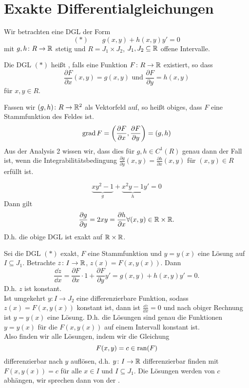\chapter{Exakte Differentialgleichungen}
Wir betrachten eine DGL der Form
\[ (\ast)\qquad g(x,y)+h(x,y)y'=0 \]
mit $ g,h\colon R\rightarrow\mathbb{R} $ stetig und $ R=J_1\times J_2 $, $ J_1,J_2\subseteq\mathbb{R} $ offene Intervalle.
\begin{definition}
	Die DGL $ (\ast) $ hei\ss t , falls eine Funktion $ F\colon R\rightarrow\mathbb{R} $ existiert, so dass
	\[ \frac{\partial F}{\partial x}(x,y)=g(x,y)\text{ und }\frac{\partial F}{\partial y}=h(x,y) \]
	f\"ur $ x,y\in R $.
\end{definition}
\begin{bemerkung}
	Fassen wir $ (g,h)\colon R\rightarrow\mathbb{R}^2 $ als Vektorfeld auf, so hei\ss t obiges, dass $ F $ eine Stammfunktion des Feldes ist.
	\[ \operatorname{grad} F=\left(\frac{\partial F}{\partial x},\frac{\partial F}{\partial y}\right)=(g,h) \]
	Aus der Analysis 2 wissen wir, dass dies f\"ur $ g,h\in C^1(R) $ genau dann der Fall ist, wenn die Integrabilit\"atsbedingung $ \frac{\partial g}{\partial y}(x,y)=\frac{\partial h}{\partial x}(x,y) $ f\"ur $ (x,y)\in R $ erf\"ullt ist. 
\end{bemerkung}
\begin{beispiel}
	\[ \underbrace{xy^2-1}_{g}+\underbrace{x^2y-1}_{h}y'=0 \]
	Dann gilt \[ \frac{\partial g}{\partial y}=2xy=\frac{\partial h}{\partial x}\forall (x,y)\in\mathbb{R}\times\mathbb{R}. \]
	D.h. die obige DGL ist exakt auf $ \mathbb{R}\times\mathbb{R} $.
\end{beispiel}
Sei die DGL $ (\ast) $ exakt, $ F $ eine Stammfunktion und $ y=y(x) $ eine L\"osung auf $ I\subseteq J_1 $. Betrachte $ z\colon I\rightarrow\mathbb{R} $, $ z(x)=F(x,y(x)) $. Dann
\[ \frac{\dd z}{\dd x}=\frac{\partial F}{\partial x}\cdot 1+\frac{\partial F}{\partial y}y'=g(x,y)+h(x,y)y'=0. \]
D.h. $ z $ ist konstant.\\
Ist umgekehrt $ y\colon I\rightarrow J_2 $ eine differenzierbare Funktion, sodass $ z(x)=F(x,y(x)) $ konstant ist, dann ist $ \frac{\dd z}{\dd x}=0 $ und nach  obiger Rechnung ist $ y=y(x) $ eine L\"osung. D.h. die L\"osungen sind genau die Funktionen $ y=y(x) $ f\"ur die $ F(x,y(x)) $ auf einem Intervall konstant ist.\\
Also finden wir alle L\"osungen, indem wir die Gleichung
\[ F(x,y)=c\in\operatorname{ran}(F) \]
differenzierbar nach $ y $ aufl\"osen, d.h. $ y\colon I\rightarrow\mathbb{R} $ differenzierbar finden mit $ F(x,y(x))=c $ f\"ur alle $ x\in I $ und $ I\subseteq J_1 $. Die L\"osungen werden von $ c $ abh\"angen, wir sprechen dann von der .\\
